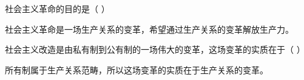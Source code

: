 \question 社会主义革命的目的是（ ）
\par{}
\begin{solution}社会主义革命是一场生产关系的变革，希望通过生产关系的变革解放生产力。
\end{solution}
\question 社会主义改造是由私有制到公有制的一场伟大的变革，这场变革的实质在于（ ）
\par{}
\begin{solution}所有制属于生产关系范畴，所以这场变革的实质在于生产关系的变革。
\end{solution}
